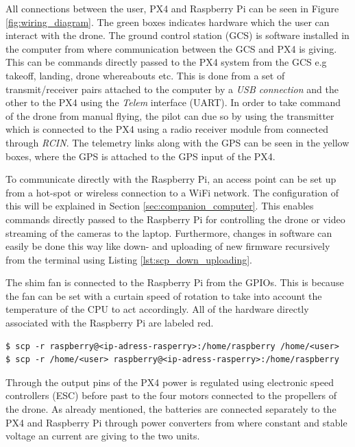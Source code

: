 \documentclass[../Head/report.tex]{subfiles}
\begin{document}
All connections between the user, PX4 and Raspberry Pi can be seen in Figure \ref{fig:wiring_diagram}. The green boxes indicates hardware which the user can interact with the drone. The ground control station (GCS) is software installed in the computer from where communication between the GCS and PX4 is giving. This can be commands directly passed to the PX4 system from the GCS e.g takeoff, landing, drone whereabouts etc. This is done from a set of transmit/receiver pairs attached to the computer by a \textit{USB connection} and the other to the PX4 using the \textit{Telem} interface (UART). In order to take command of the drone from manual flying, the pilot can due so by using the transmitter which is connected to the PX4 using a radio receiver module from connected through \textit{RCIN}. The telemetry links along with the GPS can be seen in the yellow boxes, where the GPS is attached to the GPS input of the PX4. 

To communicate directly with the Raspberry Pi, an access point can be set up from a hot-spot or wireless connection to a WiFi network. The configuration of this will be explained in Section \ref{sec:companion_computer}. This enables commands directly passed to the Raspberry Pi for controlling the drone or video streaming of the cameras to the laptop. Furthermore, changes in software can easily be done this way like down- and uploading of new firmware  recursively from the terminal using Listing \ref{lst:scp_down_uploading}.

The shim fan is connected to the Raspberry Pi from the GPIOs. This is because the fan can be set with a curtain speed of rotation to take into account the temperature of the CPU to act accordingly. All of the hardware directly associated with the Raspberry Pi are labeled red.  

\begin{lstlisting}[frame=none,caption={How to down- and upload software between laptop and Rasberry Pi respectively using the scp protocol}, label=lst:scp_down_uploading]
$ scp -r raspberry@<ip-adress-rasperry>:/home/raspberry /home/<user>
$ scp -r /home/<user> raspberry@<ip-adress-rasperry>:/home/raspberry
\end{lstlisting}

Through the output pins of the PX4 power is regulated using electronic speed controllers (ESC) before past to the four motors connected to the propellers of the drone. As already mentioned, the batteries are connected separately to the PX4 and Raspberry Pi through power converters from where constant and stable voltage an current are giving to the two units.   
\end{document}
